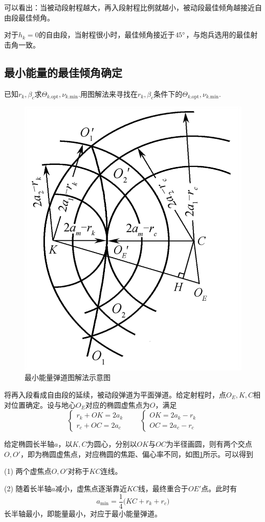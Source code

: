 可以看出：当被动段射程越大，再入段射程比例就越小，被动段最佳倾角越接近自由段最佳倾角。

对于$h_k = 0$的自由段，当射程很小时，最佳倾角接近于$45 {}^{\circ}$，与炮兵选用的最佳射击角一致。


\subsection{最小能量的最佳倾角确定}

已知$r_k, \beta_c$求$\varTheta_{k\text{.opt}}, \nu_{k\text{.min}}$.用图解法来寻找在$r_k, \beta_c$条件下的$\varTheta_{k\text{.opt}}, \nu_{k\text{.min}}$.
\begin{figure}[!htb]
	\centering
	\includegraphics[width=0.3\linewidth]{pic/最小能量-最佳倾角.jpg}
	\vspace*{-1em}
	\caption{最小能量弹道图解法示意图}
	\label{最小能量}
\end{figure}

将再入段看成自由段的延续，被动段弹道为平面弹道。给定射程时，点$O_E, K, C$相对位置确定。设与地心$O_E$对应的椭圆虚焦点为$O$，满足
\begin{equation}
	\begin{cases}
		r_k + OK = 2a_k \\
		r_c + OC = 2a_c
	\end{cases} \qquad 
	\begin{cases}
		OK = 2a_k - r_k \\
		OC = 2a_c - r_c
	\end{cases}
\end{equation}

给定椭圆长半轴$a$，以$K,C$为圆心，分别以$OK$与$OC$为半径画圆，则有两个交点$O,O'$，即为椭圆虚焦点，对应椭圆的焦距、偏心率不同，如图\ref{最小能量}所示。可以得到

(1) \hspace*{0.5em} 两个虚焦点$O,O'$对称于$KC$连线。

(2) \hspace*{0.5em} 随着长半轴$a$减小，虚焦点逐渐靠近$KC$线，最终重合于$OE'$点。此时有
\begin{equation}
	a_{\min} = \dfrac{1}{4} \big(KC + r_k + r_c\big)
\end{equation}
长半轴最小，即能量最小，对应于最小能量弹道。

